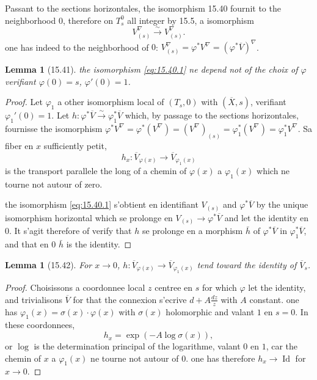 \documentclass[12pt,a4paper]{article}
\theoremstyle{plain}
\newtheorem{lemma}[theorem]{Lemma}
\theoremstyle{definition}
\theoremstyle{remark}
\newcommand{\Id}{\operatorname{Id}}
\begin{document}
Passant to the sections horizontales, the isomorphism 15.40 fournit to the neighborhood $0$, therefore on $T_s^0$ all integer by 15.5, a isomorphism
\begin{equation}\label{eq:15.40.1}
V^\nabla_{(s)} \xrightarrow{\sim} V_{(s)}^\nabla.
\end{equation}
one has indeed to the neighborhood of $0$: $V^\nabla_{(s)} = \varphi^* V^\nabla = (\varphi^* \overline{V})^\nabla$.

\begin{lemma}[15.41]
the isomorphism \eqref{eq:15.40.1} ne depend not of the choix of $\varphi$ verifiant $\varphi(0) = s$, $\varphi'(0) = 1$.
\end{lemma}

\begin{proof}
Let $\varphi_1$ a other isomorphism local of $(T_s, 0)$ with $(\overline{X}, s)$, verifiant $\varphi_1'(0) = 1$. Let $h: \varphi^* \overline{V} \xrightarrow{\sim} \varphi_1^* \overline{V}$ which, by passage to the sections horizontales, fournisse the isomorphism $\varphi^* V^\nabla = \varphi^*(V^\nabla) = (V^\nabla)_{(s)} = \varphi_1^*(V^\nabla) = \varphi_1^* V^\nabla$. Sa fiber en $x$ sufficiently petit,
\[
h_x: \overline{V}_{\varphi(x)} \to \overline{V}_{\varphi_1(x)}
\]
is the transport parallele the long of a chemin of $\varphi(x)$ a $\varphi_1(x)$ which ne tourne not autour of zero.

the isomorphism \eqref{eq:15.40.1} s'obtient en identifiant $V_{(s)}$ and $\varphi^* \overline{V}$ by the unique isomorphism horizontal which se prolonge en $V_{(s)} \to \varphi^* \overline{V}$ and let the identity en $0$. It s'agit therefore of verify that $h$ se prolonge en a morphism $\bar{h}$ of $\varphi^* \overline{V}$ in $\varphi_1^* \overline{V}$, and that en $0$ $\bar{h}$ is the identity.
\end{proof}

\begin{lemma}[15.42]
For $x \to 0$, $h: \overline{V}_{\varphi(x)} \to \overline{V}_{\varphi_1(x)}$ tend toward the identity of $\overline{V}_s$.
\end{lemma}

\begin{proof}
Choisissons a coordonnee local $z$ centree en $s$ for which $\varphi$ let the identity, and trivialisons $\overline{V}$ for that the connexion s'ecrive $d + A \frac{dz}{z}$ with $A$ constant. one has $\varphi_1(x) = \sigma(x) \cdot \varphi(x)$ with $\sigma(x)$ holomorphic and valant $1$ en $s = 0$. In these coordonnees,
\[
h_x = \exp(-A \log \sigma(x)),
\]
or $\log$ is the determination principal of the logarithme, valant $0$ en $1$, car the chemin of $x$ a $\varphi_1(x)$ ne tourne not autour of $0$. one has therefore $h_x \to \Id$ for $x \to 0$.
\end{proof}
\end{document}
